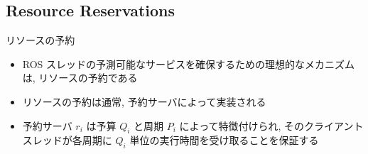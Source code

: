


\subsection{Resource Reservations}
\label{ssec: resource reservations}

\begin{frame}{リソースの予約}
    \begin{itemize}
        \item ROS スレッドの予測可能なサービスを確保するための理想的なメカニズムは, リソースの予約である
        \item リソースの予約は通常, 予約サーバによって実装される
        \item 予約サーバ $r_{i}$ は予算 $Q_{i}$ と周期 $P_{i}$ によって特徴付けられ, そのクライアントスレッドが各周期に $Q_{i}$ 単位の実行時間を受け取ることを保証する
    \end{itemize}
\end{frame}

